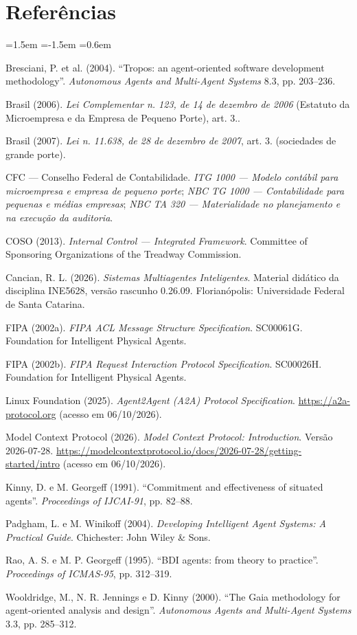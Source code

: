 \documentclass[10pt,a4paper]{article}
\begin{document}
\section*{Referências}
\begingroup\RaggedRight
\begin{list}{}{\leftmargin=1.5em \itemindent=-1.5em \itemsep=0.6em \parsep=0pt \topsep=0pt}
\item Bresciani, P. et al. (2004). “Tropos: an agent-oriented software development methodology”. \emph{Autonomous Agents and Multi-Agent Systems} 8.3, pp. 203–236.
\item Brasil (2006). \emph{Lei Complementar n.\textdegree{} 123, de 14 de dezembro de 2006} (Estatuto da Microempresa e da Empresa de Pequeno Porte), art. 3.\textordmasculine.
\item Brasil (2007). \emph{Lei n.\textdegree{} 11.638, de 28 de dezembro de 2007}, art. 3.\textordmasculine{} (sociedades de grande porte).
\item CFC — Conselho Federal de Contabilidade. \emph{ITG 1000 — Modelo contábil para microempresa e empresa de pequeno porte}; \emph{NBC TG 1000 — Contabilidade para pequenas e médias empresas}; \emph{NBC TA 320 — Materialidade no planejamento e na execução da auditoria}.
\item COSO (2013). \emph{Internal Control — Integrated Framework}. Committee of Sponsoring Organizations of the Treadway Commission.
\item Cancian, R. L. (2026). \emph{Sistemas Multiagentes Inteligentes}. Material didático da disciplina INE5628, versão rascunho 0.26.09. Florianópolis: Universidade Federal de Santa Catarina.
\item FIPA (2002a). \emph{FIPA ACL Message Structure Specification}. SC00061G. Foundation for Intelligent Physical Agents.
\item FIPA (2002b). \emph{FIPA Request Interaction Protocol Specification}. SC00026H. Foundation for Intelligent Physical Agents.
\item Linux Foundation (2025). \emph{Agent2Agent (A2A) Protocol Specification}. \url{https://a2a-protocol.org} (acesso em 06/10/2026).
\item Model Context Protocol (2026). \emph{Model Context Protocol: Introduction}. Versão 2026-07-28. \url{https://modelcontextprotocol.io/docs/2026-07-28/getting-started/intro} (acesso em 06/10/2026).
\item Kinny, D. e M. Georgeff (1991). “Commitment and effectiveness of situated agents”. \emph{Proceedings of IJCAI-91}, pp. 82–88.
\item Padgham, L. e M. Winikoff (2004). \emph{Developing Intelligent Agent Systems: A Practical Guide}. Chichester: John Wiley \& Sons.
\item Rao, A. S. e M. P. Georgeff (1995). “BDI agents: from theory to practice”. \emph{Proceedings of ICMAS-95}, pp. 312–319.
\item Wooldridge, M., N. R. Jennings e D. Kinny (2000). “The Gaia methodology for agent-oriented analysis and design”. \emph{Autonomous Agents and Multi-Agent Systems} 3.3, pp. 285–312.
\end{list}
\endgroup
\end{document}
